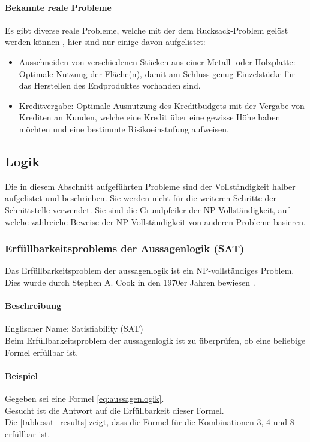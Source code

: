 	\paragraph{Bekannte reale Probleme}	
	Es gibt diverse reale Probleme, welche mit der dem Rucksack-Problem gelöst werden können \cite{kellerer2004knapsack}, hier sind nur einige davon aufgelistet:
	\begin{itemize}
		\item Ausschneiden von verschiedenen Stücken aus einer Metall- oder Holzplatte: Optimale Nutzung der Fläche(n), damit am Schluss genug Einzelstücke für das Herstellen 
			des Endproduktes vorhanden sind.
		\item Kreditvergabe: Optimale Ausnutzung des Kreditbudgets mit der Vergabe von Krediten an Kunden, welche eine Kredit über eine gewisse Höhe haben möchten und eine 
			bestimmte Risikoeinstufung aufweisen.
	\end{itemize}


\newpage
\subsection{Logik}\label{logic}
Die in diesem Abschnitt aufgeführten Probleme sind der Vollständigkeit halber aufgelistet und beschrieben. Sie werden nicht für die weiteren Schritte der Schnittstelle verwendet. Sie sind die 
Grundpfeiler der NP-Vollständigkeit, auf welche zahlreiche Beweise der NP-Vollständigkeit von anderen Probleme basieren.

	\subsubsection{Erfüllbarkeitsproblems der Aussagenlogik (SAT)}\label{sat}
	Das Erfüllbarkeitsproblem der \gls{aussagenlogik} ist ein NP-vollständiges Problem. Dies wurde durch Stephen A. Cook in den 1970er Jahren bewiesen \cite{cook_complexity}.

	\paragraph{Beschreibung}
	Englischer Name: Satisfiability (SAT)\\
	Beim Erfüllbarkeitsproblem der \gls{aussagenlogik} ist zu überprüfen, ob eine beliebige  Formel erfüllbar ist.	

	\paragraph{Beispiel} Gegeben sei eine  Formel \ref{eq:aussagenlogik}.\\
	Gesucht ist die Antwort auf die Erfüllbarkeit dieser Formel.\\
	Die \autoref{table:sat_results} zeigt, dass die Formel für die Kombinationen 3, 4 und 8 erfüllbar ist.

